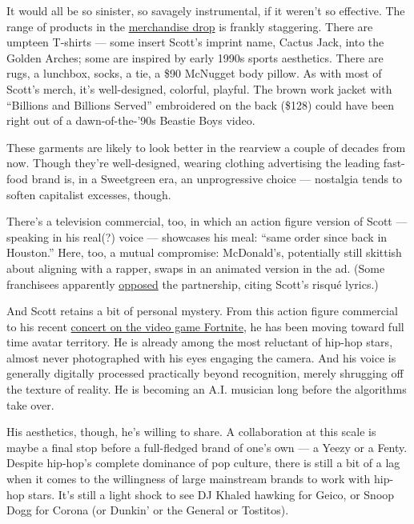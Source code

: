 It would all be so sinister, so savagely instrumental, if it weren't so
effective. The range of products in the
\href{https://shop.travisscott.com/}{merchandise drop} is frankly
staggering. There are umpteen T-shirts --- some insert Scott's imprint
name, Cactus Jack, into the Golden Arches; some are inspired by early
1990s sports aesthetics. There are rugs, a lunchbox, socks, a tie, a
\$90 McNugget body pillow. As with most of Scott's merch, it's
well-designed, colorful, playful. The brown work jacket with ``Billions
and Billions Served'' embroidered on the back (\$128) could have been
right out of a dawn-of-the-'90s Beastie Boys video.

These garments are likely to look better in the rearview a couple of
decades from now. Though they're well-designed, wearing clothing
advertising the leading fast-food brand is, in a Sweetgreen era, an
unprogressive choice --- nostalgia tends to soften capitalist excesses,
though.

There's a television commercial, too, in which an action figure version
of Scott --- speaking in his real(?) voice --- showcases his meal:
``same order since back in Houston.'' Here, too, a mutual compromise:
McDonald's, potentially still skittish about aligning with a rapper,
swaps in an animated version in the ad. (Some franchisees apparently
\href{https://www.restaurantbusinessonline.com/marketing/mcdonalds-reveals-its-multi-level-deal-travis-scott\#}{opposed}
the partnership, citing Scott's risqué lyrics.)

And Scott retains a bit of personal mystery. From this action figure
commercial to his recent
\href{https://www.theverge.com/2020/4/23/21233637/travis-scott-fortnite-concert-astronomical-live-report}{concert
on the video game Fortnite}, he has been moving toward full time avatar
territory. He is already among the most reluctant of hip-hop stars,
almost never photographed with his eyes engaging the camera. And his
voice is generally digitally processed practically beyond recognition,
merely shrugging off the texture of reality. He is becoming an A.I.
musician long before the algorithms take over.

His aesthetics, though, he's willing to share. A collaboration at this
scale is maybe a final stop before a full-fledged brand of one's own ---
a Yeezy or a Fenty. Despite hip-hop's complete dominance of pop culture,
there is still a bit of a lag when it comes to the willingness of large
mainstream brands to work with hip-hop stars. It's still a light shock
to see DJ Khaled hawking for Geico, or Snoop Dogg for Corona (or Dunkin'
or the General or Tostitos).

